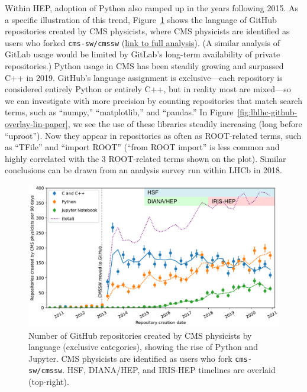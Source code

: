 \documentclass[12pt,a4paper]{article}
\begin{document}
Within HEP, adoption of Python also ramped up in the years following 2015. As a specific illustration of this trend, Figure~\ref{fig:lhlhc-github-languages-paper} shows the language of GitHub repositories created by CMS physicists, where CMS physicists are identified as users who forked {\tt cms-sw/cmssw} (\href{https://github.com/jpivarski-talks/2021-02-24-reload-statistics}{link to full analysis}). (A similar analysis of GitLab usage would be limited by GitLab's long-term availability of private repositories.) Python usage in CMS has been steadily growing and surpassed C++ in 2019. GitHub's language assignment is exclusive---each repository is considered entirely Python or entirely C++, but in reality most are mixed---so we can investigate with more precision by counting repositories that match search terms, such as ``numpy,'' ``matplotlib,'' and ``pandas.'' In Figure~\ref{fig:lhlhc-github-overlay-lin-paper}, we see the use of these libraries steadily increasing (long before ``uproot''). Now they appear in repositories as often as ROOT-related terms, such as ``TFile'' and ``import ROOT'' (``from ROOT import'' is less common and highly correlated with the 3 ROOT-related terms shown on the plot).
Similar conclusions can be drawn from an analysis survey run within LHCb in 2018.

\begin{figure}
\centering
\includegraphics[width=0.8\linewidth]{fig/lhlhc-github-languages-paper.pdf}

\caption{Number of GitHub repositories created by CMS physicists by language (exclusive categories), showing the rise of Python and Jupyter. CMS physicists are identified as users who fork {\tt cms-sw/cmssw}. HSF, DIANA/HEP, and IRIS-HEP timelines are overlaid (top-right). \label{fig:lhlhc-github-languages-paper}}
\end{figure}
\end{document}
